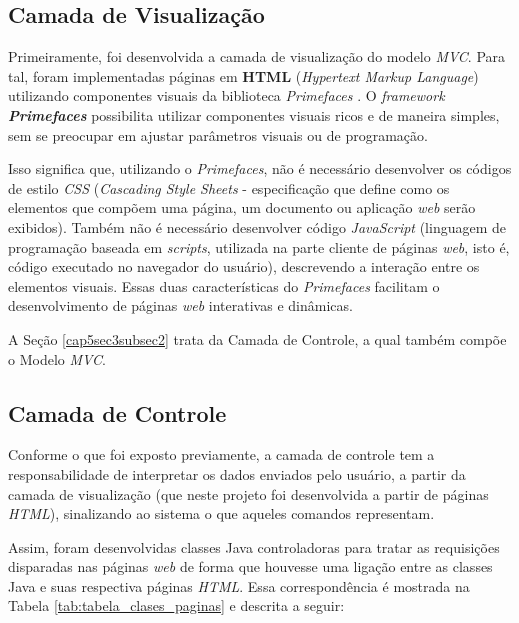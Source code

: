 \subsection{Camada de Visualização} \label{cap5sec4subsec2}

Primeiramente, foi desenvolvida a camada de visualização do modelo \textit{MVC}. Para tal, foram implementadas páginas em \textbf{HTML} \cite{html_rfc} (\textit{Hypertext Markup Language}) utilizando componentes visuais da biblioteca \textit{Primefaces} \cite{primefaces_url}. O \textit{framework} \textbf{\textit{Primefaces}} possibilita utilizar componentes visuais ricos e de maneira simples, sem se preocupar em ajustar parâmetros visuais ou de programação. 

Isso significa que, utilizando o \textit{Primefaces}, não é necessário desenvolver os códigos de estilo \textit{CSS} \cite{css_rfc} (\textit{Cascading Style Sheets} - especificação que define como os elementos que compõem uma página, um documento ou aplicação \textit{web} serão exibidos). Também não é necessário desenvolver código \textit{JavaScript} \cite{js_rfc} (linguagem de programação baseada em \textit{scripts}, utilizada na parte cliente de páginas \textit{web}, isto é, código executado no navegador do usuário), descrevendo a interação entre os elementos visuais. Essas duas características do \textit{Primefaces} facilitam o desenvolvimento de páginas \textit{web} interativas e dinâmicas. 

A Seção \ref{cap5sec3subsec2} trata da Camada de Controle, a qual também compõe o Modelo \textit{MVC}.

\subsection{Camada de Controle} \label{cap5sec4subsec3}

Conforme o que foi exposto previamente, a camada de controle tem a responsabilidade de interpretar os dados enviados pelo usuário, a partir da camada de visualização (que neste projeto foi desenvolvida a partir de páginas \textit{HTML}), sinalizando ao sistema o que aqueles comandos representam.

Assim, foram desenvolvidas classes Java controladoras para tratar as requisições disparadas nas páginas \textit{web} de forma que houvesse uma ligação entre as classes Java e suas respectiva páginas \textit{HTML}. Essa correspondência é mostrada na Tabela \ref{tab:tabela_clases_paginas} e descrita a seguir:

